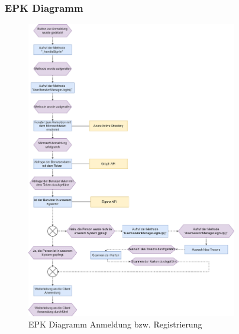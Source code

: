 {{\subsubsection{EPK Diagramm}
\begin{figure}[h!]
\centering
\includegraphics[width=0.82\textwidth]{FLUTTER/images/GP/LoginAblaufEPK.png}
\caption{EPK Diagramm Anmeldung bzw. Registrierung}
\end{figure}

\newpage


}}
